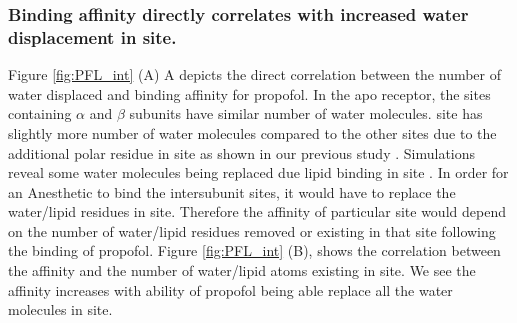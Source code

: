 \documentclass{biophys}
\begin{document}
\subsubsection{Binding affinity directly correlates with increased water displacement in site.}
Figure \ref{fig:PFL_int} (A) A depicts the direct correlation between the number of water displaced and binding affinity for propofol. In the apo receptor,  the sites containing $\alpha$ and $\beta$ subunits have similar number of water molecules. \gb site has slightly more number of water molecules compared to the other sites due to the additional polar residue in site as shown in our previous study \citep{Woll2016a}. Simulations reveal some water molecules being replaced due lipid binding in site \ag. In order for an Anesthetic to bind the intersubunit sites, it would have to replace the water/lipid residues in site. Therefore the affinity of particular site would depend on the number of water/lipid residues removed or existing in that site following the binding of propofol. Figure  \ref{fig:PFL_int} (B), shows the correlation between the affinity and the number of water/lipid atoms existing in site. We see the affinity increases with ability of propofol being able replace all the water molecules in site.


\end{document}
